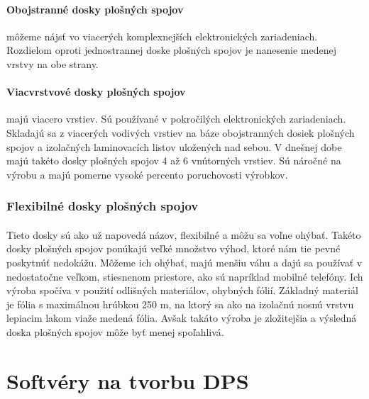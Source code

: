 \documentclass[12pt,slovak,a4paper, twocolumn]{article}
\begin{document}
\paragraph{Obojstranné dosky plošných spojov} môžeme nájsť vo viacerých komplexnejších elektronických zariadeniach. Rozdielom oproti jednostrannej doske plošných spojov je nanesenie medenej vrstvy na obe strany.  
\paragraph{Viacvrstvové dosky plošných spojov} majú viacero vrstiev. Sú používané v pokročilých elektronických zariadeniach. Skladajú sa z viacerých vodivých vrstiev na báze obojstranných dosiek plošných spojov a izolačných laminovacích listov uložených nad sebou. V dnešnej dobe majú takéto dosky plošných spojov 4 až 6 vnútorných vrstiev. Sú náročné na výrobu a majú pomerne vysoké percento poruchovosti výrobkov\cite{tukedps}.

\subsubsection{Flexibilné dosky plošných spojov}

\paragraph{} Tieto dosky sú ako už napovedá názov, flexibilné a môžu sa voľne ohýbať. Takéto dosky plošných spojov ponúkajú veľké množstvo výhod, ktoré nám tie pevné poskytnúť nedokážu. Môžeme ich ohýbať, majú menšiu váhu a dajú sa používať v nedostatočne veľkom, stiesnenom priestore, ako sú napríklad mobilné telefóny. Ich výroba spočíva v použití odlišných materiálov, ohybných fólií. Základný materiál je fólia s maximálnou hrúbkou 250 {\textmu}m, na ktorý sa ako na izolačnú nosnú vrstvu lepiacim lakom viaže medená fólia. Avšak takáto výroba je zložitejšia a výsledná doska plošných spojov môže byť menej spoľahlivá\cite{tukedps}.

\section{Softvéry na tvorbu DPS} \label{softvery}
\end{document}
